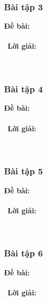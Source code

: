 \documentclass[a4paper]{article}
\begin{document}
\subsubsection{Bài tập 3}
\textbf{Đề bài:} 
\\\ \\\
\textbf{Lời giải:} \\\ \\\
\clearpage
\subsubsection{Bài tập 4}
\textbf{Đề bài:} 
\\\ \\\
\textbf{Lời giải:} \\\ \\\
\clearpage
\subsubsection{Bài tập 5}
\textbf{Đề bài:} 
\\\ \\\
\textbf{Lời giải:} \\\ \\\
\clearpage
\subsubsection{Bài tập 6}
\textbf{Đề bài:} 
\\\ \\\
\textbf{Lời giải:} \\\ \\\
\clearpage
\end{document}
